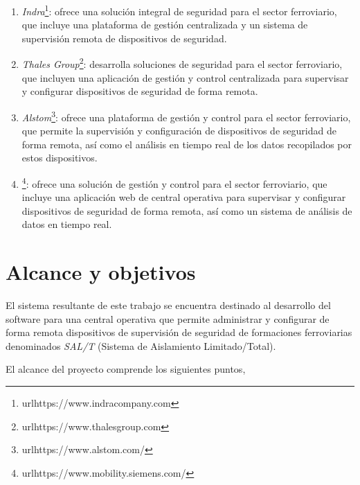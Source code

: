 \begin{enumerate}

  \item \textit{Indra}\footnote{url{https://www.indracompany.com}}: ofrece una solución integral de seguridad para el sector ferroviario, que incluye una plataforma de gestión centralizada y un sistema de supervisión remota de dispositivos de seguridad.

  \item \textit{Thales Group}\footnote{url{https://www.thalesgroup.com}}: desarrolla soluciones de seguridad para el sector ferroviario, que incluyen una aplicación de gestión y control centralizada para supervisar y configurar dispositivos de seguridad de forma remota.

  \item \textit{Alstom}\footnote{url{https://www.alstom.com/}}: ofrece una plataforma de gestión y control para el sector ferroviario, que permite la supervisión y configuración de dispositivos de seguridad de forma remota, así como el análisis en tiempo real de los datos recopilados por estos dispositivos.

  \item {}\footnote{url{https://www.mobility.siemens.com/}}: ofrece una solución de gestión y control para el sector ferroviario, que incluye una aplicación web de central operativa para supervisar y configurar dispositivos de seguridad de forma remota, así como un sistema de análisis de datos en tiempo real.

\end{enumerate}


\section{Alcance y objetivos}

El sistema resultante de este trabajo se encuentra destinado al desarrollo del software para una central operativa que permite administrar y configurar de forma remota dispositivos de supervisión de seguridad de formaciones ferroviarias denominados \textit{SAL/T} (Sistema de Aislamiento Limitado/Total). 


El alcance del proyecto comprende los siguientes puntos,

